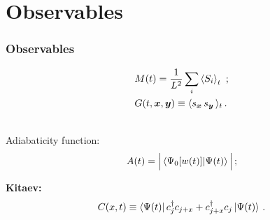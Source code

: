 \section{Observables}

\begin{frame}
	\frametitle{Observables}

	\begin{center}
	\begin{align}
		&M(t) = \frac{1}{L^2} \sum_{i} \braket{S_i}_t \,\,; \\
		&G(t,{\bm x},{\bm y}) \equiv \langle s_{\bm x}\, s_{\bm y}\,
		\rangle_t \,.
	\end{align}
	\end{center}
	\begin{center}
	\\
	Adiabaticity function:
	\begin{eqnarray}
  		A(t) = \Big|\braket{ \Psi_0[w(t)] | \Psi(t) }\Big|\,;
  		\label{adtfunc}
	\end{eqnarray}
	\end{center}
	
	\begin{center}
	{\bf Kitaev:}
	\begin{align}
		C(x,t)  \equiv  \langle \Psi(t) |
  		\, c_j^\dagger c_{j+x} 
  		+ c_{j+x}^\dagger c_{j} \, | \Psi(t) \rangle \, \, . \notag
	\end{align}
	\end{center}
	
	
\end{frame}


